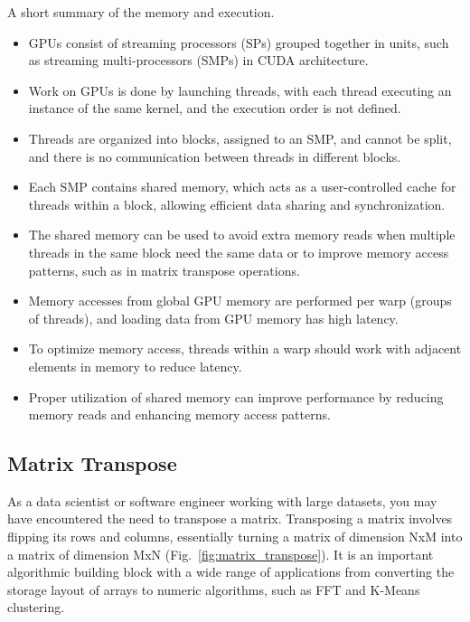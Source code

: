 \par
A short summary of the memory and execution.
\begin{itemize}
    \item GPUs consist of streaming processors (SPs) grouped together in units, such as streaming multi-processors (SMPs) in CUDA architecture.
    \item Work on GPUs is done by launching threads, with each thread executing an instance of the same kernel, and the execution order is not defined.
    \item Threads are organized into blocks, assigned to an SMP, and cannot be split, and there is no communication between threads in different blocks.
    \item Each SMP contains shared memory, which acts as a user-controlled cache for threads within a block, allowing efficient data sharing and synchronization.
    \item The shared memory can be used to avoid extra memory reads when multiple threads in the same block need the same data or to improve memory access patterns, such as in matrix transpose operations.
    \item Memory accesses from global GPU memory are performed per warp (groups of threads), and loading data from GPU memory has high latency.
    \item To optimize memory access, threads within a warp should work with adjacent elements in memory to reduce latency.
    \item Proper utilization of shared memory can improve performance by reducing memory reads and enhancing memory access patterns.
\end{itemize}




\subsection{Matrix Transpose}\label{subsection:matrix_transpose}


\par
As a data scientist or software engineer working with large datasets, you may have encountered the need to transpose a matrix.
Transposing a matrix involves flipping its rows and columns, essentially turning a matrix of dimension NxM into a matrix of dimension MxN (Fig.~\ref{fig:matrix_transpose}).
It is an important algorithmic building block with a wide range of applications from converting the storage layout of arrays to numeric algorithms, such as FFT and K-Means clustering.


